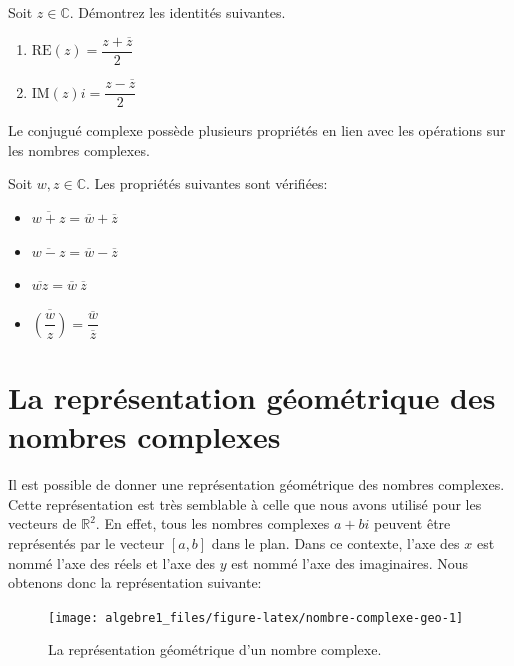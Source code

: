 \documentclass[]{book}
\providecommand{\tightlist}{%
  \setlength{\itemsep}{0pt}\setlength{\parskip}{0pt}}
\theoremstyle{definition}
\theoremstyle{definition}
\theoremstyle{definition}
\theoremstyle{remark}
\let\BeginKnitrBlock\begin \let\EndKnitrBlock\end
\begin{document}
\BeginKnitrBlock{example}
\protect\hypertarget{exm:unnamed-chunk-160}{}{\label{exm:unnamed-chunk-160} }Soit \(z\in\mathbb{C}\). Démontrez les identités suivantes.

\begin{enumerate}
\def\labelenumi{\alph{enumi}.}
\tightlist
\item
  \(\text{RE}(z)=\dfrac{z+\overline{z}}{2}\)
\item
  \(\text{IM}(z)i=\dfrac{z-\overline{z}}{2}\)
\end{enumerate}
\EndKnitrBlock{example}

Le conjugué complexe possède plusieurs propriétés en lien avec les opérations sur les nombres complexes.

\BeginKnitrBlock{theorem}
\protect\hypertarget{thm:unnamed-chunk-161}{}{\label{thm:unnamed-chunk-161} }Soit \(w,z\in\mathbb{C}\). Les propriétés suivantes sont vérifiées:

\begin{itemize}
\tightlist
\item
  \(\overline{w+z}=\overline{w}+\overline{z}\)
\item
  \(\overline{w-z}=\overline{w}-\overline{z}\)
\item
  \(\overline{wz}=\overline{w}\ \overline{z}\)
\item
  \(\overline{\left(\dfrac{w}{z}\right)}=\dfrac{\overline{w}}{\overline{z}}\)
\end{itemize}
\EndKnitrBlock{theorem}

\hypertarget{la-repruxe9sentation-guxe9omuxe9trique-des-nombres-complexes}{%
\section{La représentation géométrique des nombres complexes}\label{la-repruxe9sentation-guxe9omuxe9trique-des-nombres-complexes}}

Il est possible de donner une représentation géométrique des nombres complexes. Cette représentation est très semblable à celle que nous avons utilisé pour les vecteurs de \(\mathbb{R}^2\). En effet, tous les nombres complexes \(a+bi\) peuvent être représentés par le vecteur \([a,b]\) dans le plan. Dans ce contexte, l'axe des \(x\) est nommé l'axe des réels et l'axe des \(y\) est nommé l'axe des imaginaires. Nous obtenons donc la représentation suivante:

\begin{figure}

{\centering \texttt{[image: algebre1\_files/figure-latex/nombre-complexe-geo-1]} 

}

\caption{La représentation géométrique d'un nombre complexe.}\label{fig:nombre-complexe-geo}
\end{figure}
\end{document}
